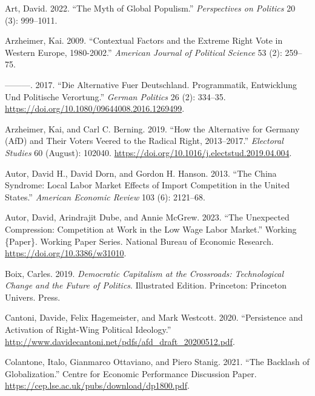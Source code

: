 \documentclass[
]{article}
\newlength{\cslhangindent}
\newlength{\cslentryspacingunit} %
\newenvironment{CSLReferences}[2] %
 {%
  \setlength{\parindent}{0pt}
  \ifodd #1
  \let\oldpar\par
  \def\par{\hangindent=\cslhangindent\oldpar}
  \fi
  \setlength{\parskip}{#2\cslentryspacingunit}
 }%
 {}
\begin{document}
\hypertarget{refs}{}
\begin{CSLReferences}{1}{0}
\leavevmode{}%
Art, David. 2022. {``The {Myth} of {Global} {Populism}.''}
\emph{Perspectives on Politics} 20 (3): 999--1011.

\leavevmode{}%
Arzheimer, Kai. 2009. {``Contextual {Factors} and the {Extreme} {Right}
{Vote} in {Western} {Europe}, 1980-2002.''} \emph{American Journal of
Political Science} 53 (2): 259--75.

\leavevmode{}%
---------. 2017. {``Die {Alternative} Fuer {Deutschland}.
{Programmatik}, {Entwicklung} Und Politische {Verortung}.''}
\emph{German Politics} 26 (2): 334--35.
\url{https://doi.org/10.1080/09644008.2016.1269499}.

\leavevmode{}%
Arzheimer, Kai, and Carl C. Berning. 2019. {``How the {Alternative} for
{Germany} ({AfD}) and Their Voters Veered to the Radical Right,
2013--2017.''} \emph{Electoral Studies} 60 (August): 102040.
\url{https://doi.org/10.1016/j.electstud.2019.04.004}.

\leavevmode{}%
Autor, David H., David Dorn, and Gordon H. Hanson. 2013. {``The {China}
{Syndrome}: {Local} {Labor} {Market} {Effects} of {Import} {Competition}
in the {United} {States}.''} \emph{American Economic Review} 103 (6):
2121--68.

\leavevmode{}%
Autor, David, Arindrajit Dube, and Annie McGrew. 2023. {``The
{Unexpected} {Compression}: {Competition} at {Work} in the {Low} {Wage}
{Labor} {Market}.''} Working \{Paper\}. Working {Paper} {Series}.
National Bureau of Economic Research.
\url{https://doi.org/10.3386/w31010}.

\leavevmode{}%
Boix, Carles. 2019. \emph{Democratic {Capitalism} at the {Crossroads}:
{Technological} {Change} and the {Future} of {Politics}}. Illustrated
Edition. Princeton: Princeton Univers. Press.

\leavevmode{}%
Cantoni, Davide, Felix Hagemeister, and Mark Westcott. 2020.
{``Persistence and {Activation} of {Right}-{Wing} {Political}
{Ideology}.''}
\url{http://www.davidecantoni.net/pdfs/afd_draft_20200512.pdf}.

\leavevmode{}%
Colantone, Italo, Gianmarco Ottaviano, and Piero Stanig. 2021. {``The
Backlash of Globalization.''} Centre for {Economic} {Performance}
{Discussion} {Paper}.
\url{https://cep.lse.ac.uk/pubs/download/dp1800.pdf}.


\end{CSLReferences}
\end{document}
